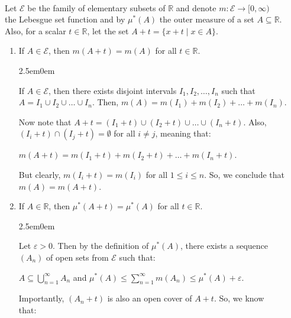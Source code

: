 \documentclass{book}
\newcommand{\exTwo}{%
   \color{RedViolet}%
   \fontsize{13}{15}\selectfont%
}
\newenvironment{myIndent}{%
   \begin{adjustwidth}{2.5em}{0em}%
}{%
   \end{adjustwidth}%
}
\newcommand{\mySepTwo}[1][.]{%
   {\noindent\color{#1}{\rule{6.5in}{0.5mm}}}\\%
}
\newcommand{\retTwo}{\hfill\bigbreak}
\begin{document}
\mySepTwo

Let $\mathcal{E}$ be the family of elementary subsets of $\mathbb{R}$ and denote $m: \mathcal{E} \rightarrow [0, \infty)$\\ the Lebesgue set function and by $\mu^*(A)$ the outer measure of a set $A \subseteq \mathbb{R}$.  \\Also, for a scalar $t \in \mathbb{R}$, let the set $A + t = \{x + t \mid x \in A\}$.

\begin{enumerate}
   \item If $A \in \mathcal{E}$, then $m(A + t) = m(A)$ for all $t \in \mathbb{R}$.
   {\begin{myIndent}\exTwo
      If $A \in \mathcal{E}$, then there exists disjoint intervals $I_1, I_2, \ldots, I_n$ such that\\ $A = I_1 \cup I_2 \cup \ldots \cup I_n$. Then, $m(A) = m(I_1) + m(I_2) + \ldots + m(I_n)$.\retTwo

      Now note that $A + t = (I_1 + t) \cup (I_2 + t) \cup \ldots \cup (I_n + t)$. Also,\\ $(I_i + t) \cap (I_j + t) = \emptyset$ for all $i \neq j$, meaning that:
      
      {\centering $m(A + t) = m(I_1 + t) + m(I_2 + t) + \ldots + m(I_n + t)$.\retTwo\par} 

      But clearly, $m(I_i + t) = m(I_i)$ for all $1 \leq i \leq n$. So, we conclude that\\ $m(A) = m(A + t)$.\retTwo
   \end{myIndent}}

   \item If $A \in \mathbb{R}$, then $\mu^*(A + t) = \mu^*(A)$ for all $t \in \mathbb{R}$.
   {\begin{myIndent}\exTwo
      Let $\varepsilon > 0$. Then by the definition of $\mu^*(A)$, there exists a sequence\\ $(A_n)$ of open sets from $\mathcal{E}$ such that:
      
      {\centering$A \subseteq \bigcup\limits_{n=1}^\infty A_n$ and $\mu^*(A) \leq \sum\limits_{n=1}^\infty m(A_n) \leq \mu^*(A) + \varepsilon$.\par}
      
      \newpage

      Importantly, $(A_n + t)$ is also an open cover of $A + t$. So, we know\\ that:\\ [-20pt]
      

\end{myIndent}}
\end{enumerate}
\end{document}
